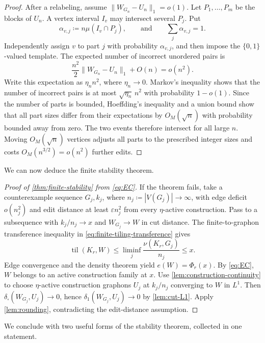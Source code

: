 \documentclass[10pt]{article}
\numberwithin{equation}{section}
\newcommand{\til}{\operatorname{til}}
\newcommand{\eps}{\varepsilon}
\newcommand{\distone}{\delta_1}
\newcommand{\distsq}{\delta_\square}
\begin{document}
\begin{proof}
After a relabeling, assume $\|W_{G_n}-U_n\|_1=o(1)$.  Let $P_1,\ldots,P_m$ be the blocks of $U_n$.  A vertex interval $I_v$ may intersect several $P_j$.  Put
\[
 \alpha_{v,j}\coloneqq n\mu(I_v\cap P_j),
 \qquad\text{and}\qquad \sum_j\alpha_{v,j}=1.
\]
Independently assign $v$ to part $j$ with probability $\alpha_{v,j}$, and then impose the $\{0,1\}$-valued template.  The expected number of incorrect unordered pairs is
\[
 \frac{n^2}{2}\|W_{G_n}-U_n\|_1+O(n)=o(n^2).
\]
Write this expectation as $\eta_n n^2$, where $\eta_n\to0$.  Markov's inequality shows that the number of incorrect pairs is at most $\sqrt{\eta_n}\,n^2$ with probability $1-o(1)$.  Since the number of parts is bounded, Hoeffding's inequality and a union bound show that all part sizes differ from their expectations by $O_M(\sqrt n)$ with probability bounded away from zero.  The two events therefore intersect for all large $n$.  Moving $O_M(\sqrt n)$ vertices adjusts all parts to the prescribed integer sizes and costs $O_M(n^{3/2})=o(n^2)$ further edits.
\end{proof}

We can now deduce the finite stability theorem.

\begin{proof}[Proof of \cref{thm:finite-stability} from \cref{eq:EC}]
If the theorem fails, take a counterexample sequence $G_j,k_j$, where $n_j\coloneqq|V(G_j)|\to\infty$, with edge deficit $o(n_j^2)$ and edit distance at least $\eps n_j^2$ from every $\eta$-active construction.  Pass to a subsequence with $k_j/n_j\to x$ and $W_{G_j}\to W$ in cut distance.  The finite-to-graphon transference inequality in \cref{eq:finite-tiling-transference} gives
\[
 \til(K_r,W)\le\liminf_j\frac{\nu(K_r,G_j)}{n_j}\le x.
\]
Edge convergence and the density theorem yield $e(W)=\Phi_r(x)$.  By \cref{eq:EC}, $W$ belongs to an active construction family at $x$.  Use \cref{lem:construction-continuity} to choose $\eta$-active construction graphons $U_j$ at $k_j/n_j$ converging to $W$ in $L^1$.  Then $\distsq(W_{G_j},U_j)\to0$, hence $\distone(W_{G_j},U_j)\to0$ by \cref{lem:cut-L1}.  Apply \cref{lem:rounding}, contradicting the edit-distance assumption.
\end{proof}

We conclude with two useful forms of the stability theorem, collected in one statement.
\end{document}
